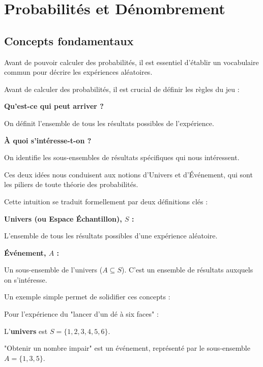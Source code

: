 \newpage
\section{Probabilités et Dénombrement}

\subsection{Concepts fondamentaux}

Avant de pouvoir calculer des probabilités, il est essentiel d'établir un vocabulaire commun pour décrire les expériences aléatoires.

\begin{intuitionbox}
Avant de calculer des probabilités, il est crucial de définir les règles du jeu :

\textbf{Qu'est-ce qui peut arriver ?}

On définit l'ensemble de tous les résultats possibles de l'expérience.

\textbf{À quoi s'intéresse-t-on ?} 

On identifie les sous-ensembles de résultats spécifiques qui nous intéressent.

Ces deux idées nous conduisent aux notions d'Univers et d'Événement, qui sont les piliers de toute théorie des probabilités.
\end{intuitionbox}

Cette intuition se traduit formellement par deux définitions clés :

\begin{definitionbox}
\textbf{Univers (ou Espace Échantillon), $S$ :} 

L'ensemble de tous les résultats possibles d'une expérience aléatoire.

\textbf{Événement, $A$ :} 

Un sous-ensemble de l'univers ($A \subseteq S$). C'est un ensemble de résultats auxquels on s'intéresse.
\end{definitionbox}

Un exemple simple permet de solidifier ces concepts :

\begin{examplebox}
Pour l'expérience du "lancer d'un dé à six faces" :

L'\textbf{univers} est $S = \{1, 2, 3, 4, 5, 6\}$.

"Obtenir un nombre impair" est un événement, représenté par le sous-ensemble $A = \{1, 3, 5\}$.
\end{examplebox}

